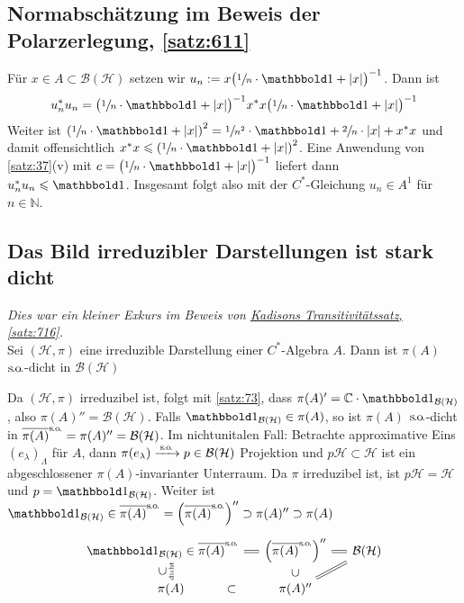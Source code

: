 \subsection{Normabschätzung im Beweis der Polarzerlegung, \ref{satz:611}} %
\label{sub:normabschatzung_im_beweis_der_polarzerlegung}
Für $x \in A \subset \mathcal{B}(\mathcal{H})$ setzen wir $u_n := x\enbrace[\big]{\sfrac{1}{n}\cdot \ind+ \abs*{x}}^{-1}$.
Dann ist
\[
	u_n^* u_n = \enbrace[\big]{\sfrac{1}{n}\cdot \ind + \abs*{x}}^{-1} x^* x \enbrace[\big]{\sfrac{1}{n}\cdot \ind + \abs*{x}}^{-1}
\]
Weiter ist $\enbrace*{\sfrac{1}{n}\cdot \ind + \abs*{x}}^2 = \sfrac{1}{n^2} \cdot \ind + \sfrac{2}{n} \cdot \abs*{x} + x^*x$ und damit offensichtlich $x^*x \le \enbrace*{\sfrac{1}{n}\cdot \ind + \abs*{x}}^2$.
Eine Anwendung von \autoref{satz:37}(v) mit $c=\enbrace[\big]{\sfrac{1}{n}\cdot \ind+ \abs*{x}}^{-1}$ liefert dann $u^*_n u_n \le \ind$.
Insgesamt folgt also mit der $C^*$-Gleichung $u_n \in A^1$ für $n \in \mathbb{N}$.

\subsection{Das Bild irreduzibler Darstellungen ist stark dicht} %
\label{sub:das_bild_irreduzibler_darstellungen}
\emph{Dies war ein kleiner Exkurs im Beweis von \hyperref[satz:716]{Kadisons Transitivitätssatz, \ref*{satz:716}}.}\smallskip \\
Sei $(\mathcal{H},\pi)$ eine irreduzible Darstellung einer $C^*$-Algebra $A$.
Dann ist $\pi(A)$ $\mathrm{\mkern.3mu s\mkern-1.4mu.\mkern-.6mu o\mkern-1.7mu.}$-dicht in $\mathcal{B}(\mathcal{H})$
\begin{beweis}
	Da $(\mathcal{H},\pi)$ irreduzibel ist, folgt mit \autoref{satz:73}, dass $\pi(A)'= \mathbb{C} \cdot \ind_{\mathcal{B}(\mathcal{H})}$, also $\pi(A)''=\mathcal{B}(\mathcal{H})$.
	Falls $\ind_{\mathcal{B}(\mathcal{H})} \in \pi(A)$, so ist $\pi(A)$ $\mathrm{\mkern.3mu s\mkern-1.4mu.\mkern-.6mu o\mkern-1.7mu.}$-dicht in $\overline{\pi(A)}^{\mathrm{\mkern.3mu s\mkern-1.4mu.\mkern-.6mu o\mkern-1.7mu.}} = \pi(A)''=\mathcal{B}(\mathcal{H})$.
	Im nichtunitalen Fall:
	Betrachte approximative Eins $(e_\lambda)_\Lambda$ für $A$, dann $\pi(e_\lambda) \grenzw{\so} p \in \mathcal{B}(\mathcal{H})$ Projektion und $p \mathcal{H} \subset \mathcal{H}$ ist ein abgeschlossener $\pi(A)$-invarianter Unterraum.
	Da $\pi$ irreduzibel ist, ist $p \mathcal{H}=\mathcal{H}$ und $p=\ind_{\mathcal{B}(\mathcal{H})}$.
	Weiter ist $\ind_{\mathcal{B}(\mathcal{H})} \in  \overline{\pi(A)}^\so = \enbrace*{\overline{\pi(A)}^\so}'' \supset \pi(A)'' \supset \pi(A)$
	\[
		\begin{tikzcd}[sep=small]
			\ind_{\mathcal{B}(\mathcal{H})} \in  \overline{\pi(A)}^\so \rar[equal] & \enbrace*{\overline{\pi(A)}^\so}''  \rar[equal] & \mathcal{B}(\mathcal{H}) \\
			\mbox{ }\hspace{1em}\pi(A) \uar[phantom,sloped,"\subset","\text{\tiny dicht}" yshift=-.7em] \rar[phantom,sloped,description,"\subset"] & \pi(A)'' \uar[phantom,sloped,description,"\subset"] \urar[equal]
		\end{tikzcd}
	\]
\end{beweis}

\printindex
\printbibliography
\listoffigures
\todototoc
{}
